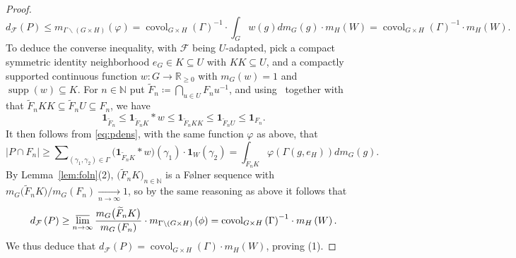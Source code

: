 \documentclass{amsart}
\numberwithin{equation}{subsection}
\theoremstyle{remark}
\begin{document}
\begin{proof}
\[d_{\mathcal{F}}\left(P\right)\leq m_{\Gamma\backslash\left(G\times H\right)}\left(\varphi\right)=\operatorname{covol}_{G\times H}\left(\Gamma\right)^{-1}\cdot\int_{G}w\left(g\right)dm_{G}\left(g\right)\cdot m_{H}\left(W\right)=\operatorname{covol}_{G\times H}\left(\Gamma\right)^{-1}\cdot m_{H}\left(W\right).\]
To deduce the converse inequality, with \(\mathcal{F}\) being \(U\)-adapted, pick a compact symmetric identity neighborhood \(e_{G}\in K\subseteq U\) with \(KK\subseteq U\), and a compactly supported continuous function \(w:G\to\mathbb{R}_{\geq 0}\) with \(m_{G}\left(w\right)=1\) and \(\operatorname{supp}\left(w\right)\subseteq K\). For \(n\in\mathbb{N}\) put \(\widetilde{F}_{n}\coloneqq\bigcap\nolimits_{u\in U}F_{n}u^{-1}\), and using~\cite[Lemma 5.11]{BjHa2022} together with that \(\widetilde{F}_{n}KK\subseteq\widetilde{F}_{n}U\subseteq F_{n}\), we have
\[\mathbf{1}_{\widetilde{F}_{n}}\leq\mathbf{1}_{\widetilde{F}_{n}K}\ast w\leq\mathbf{1}_{\widetilde{F}_{n}KK}\leq\mathbf{1}_{\widetilde{F}_{n}U}\leq\mathbf{1}_{F_{n}}.\]
It then follows from \eqref{eq:pdens}, with the same function \(\varphi\) as above, that
\[\left|P\cap F_{n}\right|\geq\sum\nolimits_{\left(\gamma_{1},\gamma_{2}\right)\in\Gamma}\big(\mathbf{1}_{\widetilde{F}_{n}K}\ast w\big)\left(\gamma_{1}\right)\cdot\mathbf{1}_{W}\left(\gamma_{2}\right)=\int_{\widetilde{F}_{n}K}\varphi\left(\Gamma\left(g,e_{H}\right)\right)dm_{G}\left(g\right).\]
By Lemma~\ref{lem:foln}(2), \(\big(\widetilde{F}_{n}K\big)_{n\in\mathbb{N}}\) is a F\o lner sequence with \(m_{G}\big(\widetilde{F}_{n}K\big)/m_{G}\left(F_{n}\right)\xrightarrow[n\to\infty]{}1\), so by the same reasoning as above it follows that
\[d_{\mathcal{F}}\left(P\right)\geq\varlimsup_{n\to\infty}\frac{m_{G}\big(\widetilde{F}_{n}K\big)}{m_{G}\left(F_{n}\right)}\cdot m_{\Gamma\backslash\left(G\times H\right)}\left(\phi\right)=\operatorname{covol}_{G\times H}\left(\Gamma\right)^{-1}\cdot m_{H}\left(W\right).\]
We thus deduce that \(d_{\mathcal{F}}\left(P\right)=\operatorname{covol}_{G\times H}\left(\Gamma\right)\cdot m_{H}\left(W\right)\), proving (1).


\end{proof}
\end{document}
